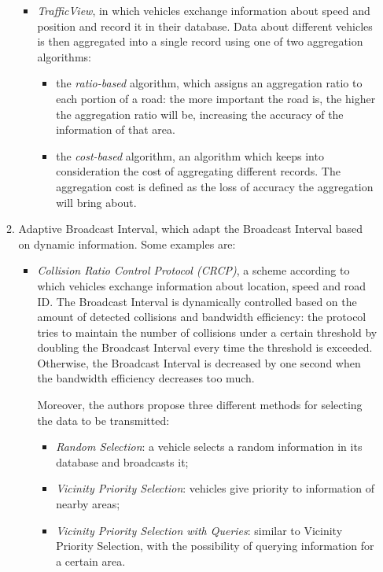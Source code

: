 \begin{enumerate}
\begin{enumerate}
\begin{itemize}
				\item \textit{TrafficView}\cite{1263039}, in which vehicles exchange information about speed and position and record it in their database. Data about different vehicles is then aggregated into a single record using one of two aggregation algorithms:
				\begin{itemize}
					\item the \textit{ratio-based} algorithm, which assigns an aggregation ratio to each portion of a road: the more important the road is, the higher the aggregation ratio will be, increasing the accuracy of the information of that area.
					\item the \textit{cost-based} algorithm, an algorithm which keeps into consideration the cost of aggregating different records. The aggregation cost is defined as the loss of accuracy the aggregation will bring about.
				\end{itemize} 
			\end{itemize}
			\item Adaptive Broadcast Interval, which adapt the Broadcast Interval based on dynamic information. Some examples are:
			\begin{itemize}
				\renewcommand\labelitemi{--}
				
				\item \textit{Collision Ratio Control Protocol (CRCP)}\cite{4357748}, a scheme according to which vehicles exchange information about location, speed and road ID. The Broadcast Interval is dynamically controlled based on the amount of detected collisions and bandwidth efficiency: the protocol tries to maintain the number of collisions under a certain threshold by doubling the Broadcast Interval every time the threshold is exceeded. Otherwise, the Broadcast Interval is decreased by one second when the bandwidth efficiency decreases too much.
				
				Moreover, the authors propose three different methods for selecting the data to be transmitted:
				\begin{itemize}
					\item \textit{Random Selection}: a vehicle selects a random information in its database and broadcasts it;
					\item \textit{Vicinity Priority Selection}: vehicles give priority to information of nearby areas;
					\item \textit{Vicinity Priority Selection with Queries}: similar to Vicinity Priority Selection, with the possibility of querying information for a certain area.
				\end{itemize}
				

\end{itemize}
\end{enumerate}
\end{enumerate}
